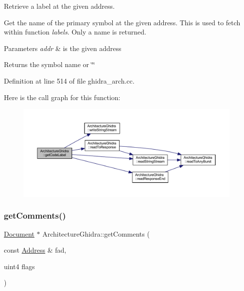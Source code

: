 Retrieve a label at the given address. 

Get the name of the primary symbol at the given address. This is used to fetch within function {\itshape labels}. Only a name is returned. 
\begin{DoxyParams}{Parameters}
{\em addr} & is the given address \\
\hline
\end{DoxyParams}
\begin{DoxyReturn}{Returns}
the symbol name or \char`\"{}\char`\"{} 
\end{DoxyReturn}


Definition at line 514 of file ghidra\+\_\+arch.\+cc.

Here is the call graph for this function\+:
\nopagebreak
\begin{figure}[H]
\begin{center}
\leavevmode
\includegraphics[width=350pt]{class_architecture_ghidra_ad66f093e36881a04b3dd40971373ce9e_cgraph}
\end{center}
\end{figure}
\mbox{\label{class_architecture_ghidra_adf2db85014f4129a11f6aadc3ac53776}} 
\subsubsection{\texorpdfstring{getComments()}{getComments()}}
{\footnotesize\ttfamily \mbox{\hyperlink{class_document}{Document}} $\ast$ Architecture\+Ghidra\+::get\+Comments (\begin{DoxyParamCaption}\item[{const \mbox{\hyperlink{class_address}{Address}} \&}]{fad,  }\item[{uint4}]{flags }\end{DoxyParamCaption})}



